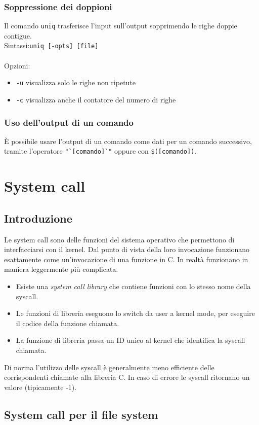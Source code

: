 \documentclass[a4paper]{article}
\begin{document}
\subsubsection{Soppressione dei doppioni} Il comando \verb|uniq| trasferisce l'input sull'output sopprimendo le righe doppie contigue. \\
Sintassi:\verb|uniq [-opts] [file]| \\ \\
Opzioni:
\begin{itemize}
\item \verb|-u| visualizza solo le righe non ripetute
\item \verb|-c| visualizza anche il contatore del numero di righe
\end{itemize}
\subsubsection{Uso dell'output di un comando}
È possibile usare l'output di un comando come dati per un comando successivo, tramite l'operatore \verb|"`[comando]`"| oppure con  \verb|$([comando])|.
\section{System call}
\subsection{Introduzione}
Le system call sono delle funzioni del sistema operativo che permettono di interfacciarsi con il kernel.
Dal punto di vista della loro invocazione funzionano esattamente come un'invocazione di una funzione in C. In realtà funzionano in maniera leggermente più complicata.
\begin{itemize}
\item Esiste una \textit{system call library} che contiene funzioni con lo stesso nome della syscall.
\item Le funzioni di libreria eseguono lo switch da user a kernel mode, per eseguire il codice della funzione chiamata.
\item La funzione di libreria passa un ID unico al kernel che identifica la syscall chiamata.
\end{itemize}
Di norma l'utilizzo delle syscall è generalmente meno efficiente delle corrispondenti chiamate alla libreria C.
In caso di errore le syscall ritornano un valore (tipicamente -1).

\subsection{System call per il file system}
\end{document}
